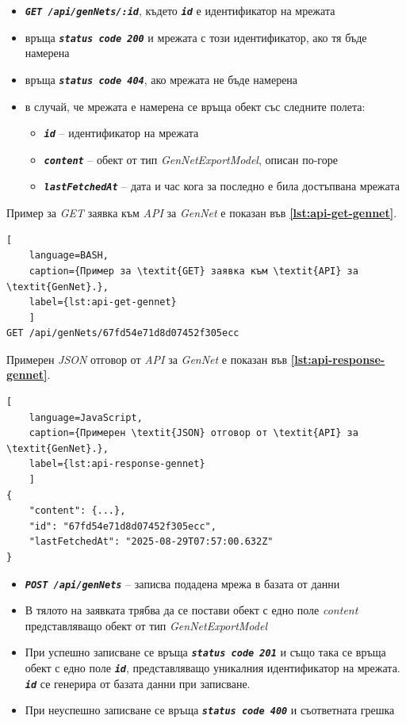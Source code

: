 \vspace{-10pt}
\begin{itemize}
	\item \texttt{\textbf{\textit{GET /api/genNets/:id}}}, където \texttt{\textbf{\textit{id}}} е идентификатор на мрежата
	\item връща \texttt{\textbf{\textit{status code 200}}} и мрежата с този идентификатор, ако тя бъде намерена
	\item връща \texttt{\textbf{\textit{status code 404}}}, ако мрежата не бъде намерена
	\item в случай, че мрежата е намерена се връща обект със следните полета:
	\begin{itemize}
		\item \texttt{\textbf{\textit{id}}} -- идентификатор на мрежата
		\item \texttt{\textbf{\textit{content}}} -- обект от тип \textit{GenNetExportModel}, описан по-горе
		\item \texttt{\textbf{\textit{lastFetchedAt}}} -- дата и час кога за последно е била достъпвана мрежата
	\end{itemize}
\end{itemize}

Пример за \textit{GET} заявка към \textit{API} за \textit{GenNet} е показан във \textbf{\autoref{lst:api-get-gennet}}.
\begin{lstlisting}[
	language=BASH,
	caption={Пример за \textit{GET} заявка към \textit{API} за \textit{GenNet}.},
	label={lst:api-get-gennet}
	]
GET /api/genNets/67fd54e71d8d07452f305ecc
\end{lstlisting}

Примерен \textit{JSON} отговор от \textit{API} за \textit{GenNet} е показан във \textbf{\autoref{lst:api-response-gennet}}.
\begin{lstlisting}[
	language=JavaScript,
	caption={Примерен \textit{JSON} отговор от \textit{API} за \textit{GenNet}.},
	label={lst:api-response-gennet}
	]
{
    "content": {...},
    "id": "67fd54e71d8d07452f305ecc",
    "lastFetchedAt": "2025-08-29T07:57:00.632Z"
}
\end{lstlisting}

\vspace{-10pt}
\begin{itemize}
	\item \texttt{\textbf{\textit{POST /api/genNets}}} -- записва подадена мрежа в базата от данни
	\item В тялото на заявката трябва да се постави обект с едно поле \textit{content} представляващо обект от тип \textit{GenNetExportModel}
	\item При успешно записване се връща \texttt{\textbf{\textit{status code 201}}} и също така се връща обект с едно поле \texttt{\textbf{\textit{id}}}, представляващо уникалния идентификатор на мрежата. \texttt{\textbf{\textit{id}}} се генерира от базата данни при записване.
	\item При неуспешно записване се връща \texttt{\textbf{\textit{status code 400}}} и съответната грешка
\end{itemize}

